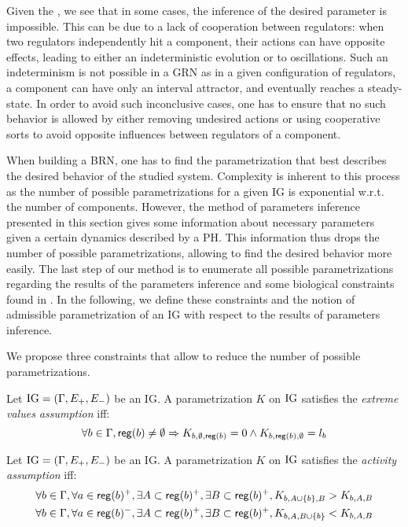 Given the , we see that in some cases, the inference of the desired parameter is impossible. This can be due to a lack of cooperation between regulators: when two regulators independently hit a component, their actions can have opposite effects, leading to either an indeterministic evolution or to oscillations. Such an indeterminism is not possible in a GRN as in a given configuration of regulators, a component can have only an interval attractor, and eventually reaches a steady-state. In order to avoid such inconclusive cases, one has to ensure that no such behavior is allowed by either removing undesired actions or using cooperative sorts to avoid opposite influences between regulators of a component.

When building a BRN, one has to find the parametrization that best describes the desired behavior of the studied system. Complexity is inherent to this process as the number of possible parametrizations for a given IG is exponential w.r.t. the number of components. However, the method of parameters inference presented in this section gives some information about necessary parameters given a certain dynamics described by a PH. This information thus drops the number of possible parametrizations, allowing to find the desired behavior more easily. The last step of our method is to enumerate all possible parametrizations regarding the results of the parameters inference and some biological constraints found in \cite{BernotSemBRN}. In the following, we define these constraints and the notion of admissible parametrization of an IG with respect to the results of parameters inference.

We propose three constraints that allow to reduce the number of possible parametrizations.

\begin{property}
Let $\mathrm{IG} = (\Gamma, E_+, E_-)$ be an IG. A parametrization $K$ on $\mathrm{IG}$ satisfies the \emph{extreme values assumption} iff:
\label{prop:param_enum_extreme}
\[
  \forall b \in \Gamma, \mathsf{reg}({b}) \neq \emptyset \Rightarrow K_{b,\emptyset,\mathsf{reg}({b})} = 0 \wedge K_{b,\mathsf{reg}({b}),\emptyset} = l_b
\]
\end{property}

\begin{property}
\label{prop:param_enum_activity}
Let $\mathrm{IG} = (\Gamma, E_+, E_-)$ be an IG. A parametrization $K$ on $\mathrm{IG}$ satisfies the \emph{activity assumption} iff:
\begin{align*}
  \forall b \in \Gamma, \forall a \in \mathsf{reg}({b})^+, \exists A \subset \mathsf{reg}({b})^+, \exists B \subset \mathsf{reg}({b})^+,
    K_{b,A \cup \{b\},B} > K_{b,A,B}
\\
  \forall b \in \Gamma, \forall a \in \mathsf{reg}({b})^-, \exists A \subset \mathsf{reg}({b})^+, \exists B \subset \mathsf{reg}({b})^+,
    K_{b,A,B \cup \{b\}} < K_{b,A,B}
\end{align*}
\end{property}

